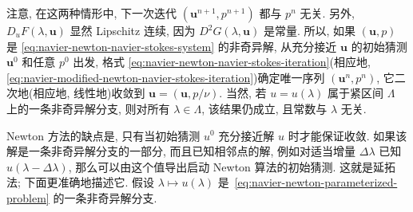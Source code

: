 注意, 在这两种情形中, 下一次迭代 $(\boldsymbol u^{n+1},p^{n+1})$ 都与 $p^n$
无关. 另外, $D_uF(\lambda,\mathbf u)$ 显然 Lipschitz 连续, 因为
$D^2G(\lambda,\mathbf u)$ 是常量. 所以, 如果 $(\boldsymbol u,p)$ 是
\eqref{eq:navier-newton-navier-stokes-system} 的非奇异解, 从充分接近 $\boldsymbol u$
的初始猜测 $\boldsymbol u^0$ 和任意 $p^0$ 出发, 格式
\eqref{eq:navier-newton-navier-stokes-iteration}(相应地,
\eqref{eq:navier-modified-newton-navier-stokes-iteration})确定唯一序列
$(\boldsymbol u^n,p^n)$, 它二次地(相应地, 线性地)收敛到
$\mathbf u=(\boldsymbol u,p/\nu)$. 当然, 若 $u=u(\lambda)$ 属于紧区间
$\Lambda$ 上的一条非奇异解分支, 则对所有 $\lambda\in\Lambda$, 该结果仍成立,
且常数与 $\lambda$ 无关.

Newton 方法的缺点是, 只有当初始猜测 $u^0$ 充分接近解 $u$ 时才能保证收敛.
如果该解是一条非奇异解分支的一部分, 而且已知相邻点的解, 例如对适当增量
$\Delta\lambda$ 已知 $u(\lambda-\Delta\lambda)$, 那么可以由这个值导出启动
Newton 算法的初始猜测. 这就是延拓法; 下面更准确地描述它. 假设
$\lambda\mapsto u(\lambda)$ 是 \,\eqref{eq:navier-newton-parameterized-problem}
的一条非奇异解分支.

